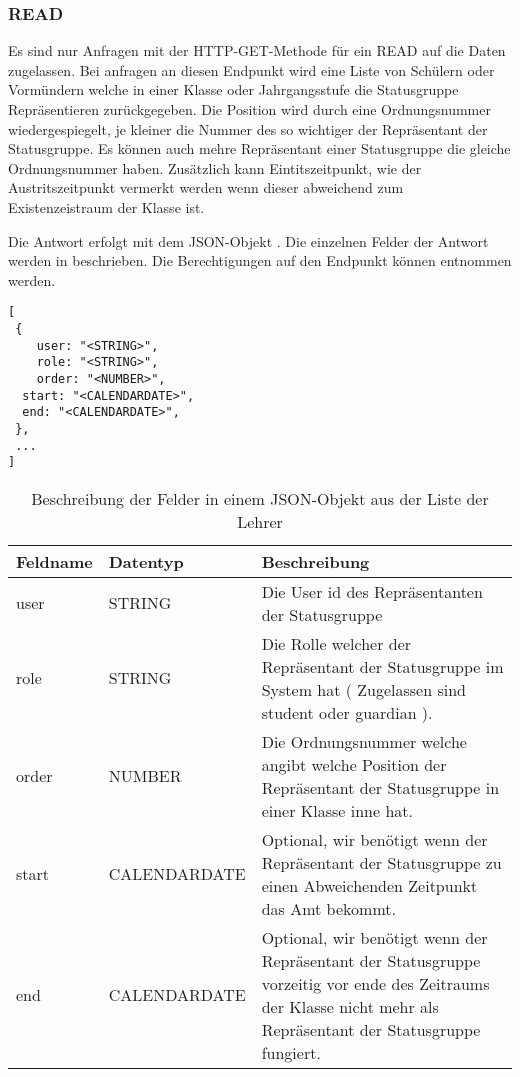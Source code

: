 \subsubsection{READ}
\label{sec:rest:api:classes:id:representatives:read}
Es sind nur Anfragen mit der HTTP-GET-Methode für ein READ auf die Daten zugelassen.
Bei anfragen an diesen Endpunkt wird eine Liste von Schülern oder Vormündern welche in einer Klasse oder Jahrgangsstufe die Statusgruppe Repräsentieren zurückgegeben.
Die Position wird durch eine Ordnungsnummer wiedergespiegelt, je kleiner die Nummer des so wichtiger der Repräsentant der Statusgruppe.
Es können auch mehre Repräsentant einer Statusgruppe die gleiche Ordnungsnummer haben.
Zusätzlich kann Eintitszeitpunkt, wie der Austritszeitpunkt vermerkt werden wenn dieser abweichend zum Existenzeistraum der Klasse ist.

Die Antwort erfolgt mit dem JSON-Objekt . 
Die einzelnen Felder der Antwort werden in  beschrieben.
Die Berechtigungen auf den Endpunkt können  entnommen werden.

\begin{lstlisting}[caption={JSON-Antwort für einen GET-Aufruf der Route /api/classes/\$id/representatives},label={lst:code:rest:api:classes:id:representatives:read:ret},frame=tlrb]
[ 
 { 
	user: "<STRING>",
	role: "<STRING>",
	order: "<NUMBER>",
  start: "<CALENDARDATE>",
  end: "<CALENDARDATE>",
 },
 ... 
]
\end{lstlisting}

\begin{longtable}{|p{}|p{}|p{}|}
		\caption{Beschreibung der Felder in einem JSON-Objekt aus der Liste der Lehrer}
\endfoot
		\caption{Beschreibung der Felder in einem JSON-Objekt aus der Liste der Lehrer}
		\label{tab:rest:api:classes:id:representatives:read:ret}
\endlastfoot 
\hline
			\textbf{Feldname} & \textbf{Datentyp} & \textbf{Beschreibung} \\ \hline
\endhead
user & STRING & Die User id des Repräsentanten der Statusgruppe \\ \hline
role & STRING & Die Rolle welcher der Repräsentant der Statusgruppe im System hat ( Zugelassen sind student oder guardian ). \\ \hline
order & NUMBER & Die Ordnungsnummer welche angibt welche Position der Repräsentant der Statusgruppe in einer Klasse inne hat. \\ \hline
start & CALENDARDATE & Optional, wir benötigt wenn der Repräsentant der Statusgruppe zu einen Abweichenden Zeitpunkt das Amt bekommt. \\ \hline
end & CALENDARDATE & Optional, wir benötigt wenn der Repräsentant der Statusgruppe vorzeitig vor ende des Zeitraums der Klasse nicht mehr als Repräsentant der Statusgruppe fungiert. \\ \hline
\end{longtable}


